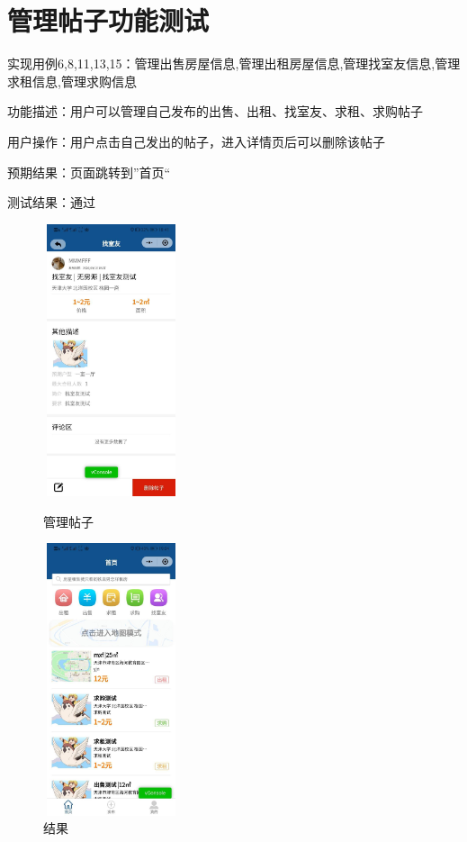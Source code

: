    \section{管理帖子功能测试}

   实现用例6,8,11,13,15：管理出售房屋信息,管理出租房屋信息,管理找室友信息,管理求租信息,管理求购信息

   功能描述：用户可以管理自己发布的出售、出租、找室友、求租、求购帖子
   
   用户操作：用户点击自己发出的帖子，进入详情页后可以删除该帖子
   
   预期结果：页面跳转到”首页“
   
   测试结果：通过
   
   \begin{figure}[htbp]
       \centering
       \begin{minipage}[t]{0.48\textwidth}
       \centering
       \includegraphics[width=4cm,height=8cm]{test/image/test36.png} 
    
      \caption{管理帖子} 
       \end{minipage}
       \begin{minipage}[t]{0.48\textwidth}
       \centering
       \includegraphics[width=4cm,height=8cm]{test/image/test37.png}
       \caption{结果}
       \end{minipage}
       \end{figure}
      \newpage 

